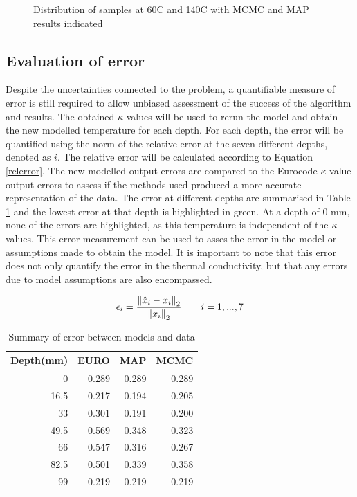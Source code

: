 \begin{figure}
\begin{subfigure}[b]{0.2\linewidth}
	\end{subfigure}
	\caption{Distribution of samples at 60\textdegree C and 140\textdegree C with MCMC and MAP results indicated}
	\label{fig:histo}
\end{figure}

%


\subsection{Evaluation of error}
Despite the uncertainties connected to the problem, a quantifiable measure of error is still required to allow unbiased assessment of the success of the algorithm and results.
The obtained $\kappa$-values will be used to rerun the model and obtain the new modelled temperature for each depth. 
For each depth, the error will be quantified using the norm of the relative error at the seven different depths, denoted as $i$.
The relative error will be calculated according to  Equation \ref{relerror}. 
The new modelled output errors are compared to the Eurocode $\kappa$-value output errors to assess if the methods used produced a more accurate representation of the data.
The error at different depths are summarised in Table \ref{errortab} and the lowest error at that depth is highlighted in green. 
At a depth of 0 mm, none of the errors are highlighted, as this temperature is independent of the $\kappa$-values.
This error measurement can be used to asses the error in the model or assumptions made to obtain the model.
It is important to note that this error does not only quantify the error in the thermal conductivity, but that any errors due to model assumptions are also encompassed.

\begin{equation}\label{relerror}
\epsilon _i = \frac{\left\lVert\hat{x}_i-x_i \right\rVert_2}{\left\lVert x_i\right\rVert_2} \quad \quad i= 1, ... ,7
\end{equation}

\begin{table}[H] 
\centering
\caption{Summary of error between models and data}
\label{errortab}
	\begin{tabular}{ r r r r }
	\toprule
	Depth(mm) & EURO & MAP & MCMC\\
	\midrule
	0 & 0.289 & 0.289 & 0.289\\
	16.5 & 0.217 & \cellcolor{green!20}0.194 & 0.205\\
	33 & 0.301   & \cellcolor{green!20} 0.191 & 0.200\\
	49.5 & 0.569 & 0.348 &\cellcolor{green!20} 0.323\\
	66 & 0.547   & 0.316 & \cellcolor{green!20}0.267\\
	82.5 & 0.501 &\cellcolor{green!20} 0.339 & 0.358\\
	99 & 0.219   & 0.219 &\cellcolor{green!20} 0.219\\
	\bottomrule	
	\end{tabular}
	
\end{table}

